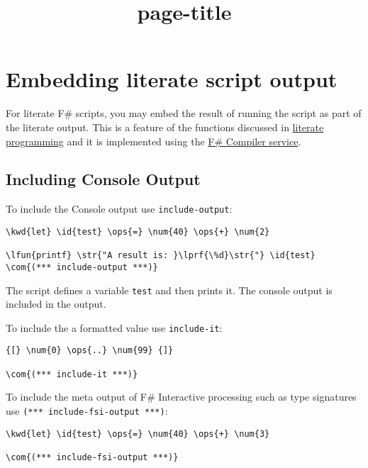 \documentclass{article}
\title{{page-title}}
\date{}
\newcommand{\id}[1]{\textcolor{black}{#1}}
\newcommand{\com}[1]{\textcolor{officegreen}{#1}}
\newcommand{\kwd}[1]{\textcolor{navy}{#1}}
\newcommand{\num}[1]{\textcolor{officegreen}{#1}}
\newcommand{\ops}[1]{\textcolor{purple}{#1}}
\newcommand{\str}[1]{\textcolor{olive}{#1}}
\begin{document}
\maketitle

\section*{Embedding literate script output}



For literate F\# scripts, you may embed the result of running the script as part of the literate output.
This is a feature of the functions discussed in \href{literate.html}{literate programming} and
it is implemented using the \href{http://fsharp.github.io/FSharp.Compiler.Service/}{F\# Compiler service}.
\subsection*{Including Console Output}



To include the Console output use \texttt{include-output}:
\begin{Verbatim}[commandchars=\\\{\}]
\kwd{let} \id{test} \ops{=} \num{40} \ops{+} \num{2}

\lfun{printf} \str{"A result is: }\lprf{\%d}\str{"} \id{test}
\com{(*** include-output ***)}

\end{Verbatim}



The script defines a variable \texttt{test} and then prints it. The console output is included
in the output.


To include the a formatted value use \texttt{include-it}:
\begin{Verbatim}[commandchars=\\\{\}]
{[} \num{0} \ops{..} \num{99} {]}

\com{(*** include-it ***)}

\end{Verbatim}



To include the meta output of F\# Interactive processing such as type signatures use \texttt{(*** include-fsi-output ***)}:
\begin{Verbatim}[commandchars=\\\{\}]
\kwd{let} \id{test} \ops{=} \num{40} \ops{+} \num{3}

\com{(*** include-fsi-output ***)}

\end{Verbatim}
\end{document}
